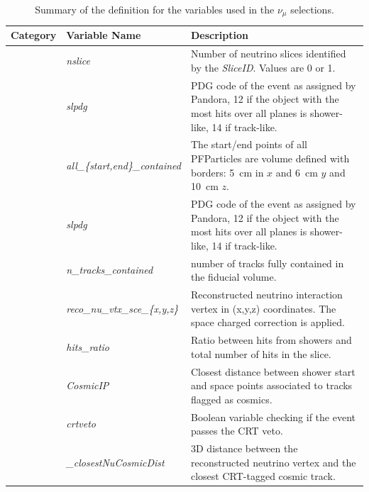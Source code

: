 \begin{table}[ht]
\caption{\label{tab:numuvariableSummary} Summary of the definition for the variables used in the $\nu_{\mu}$ selections.}
\centering
\begin{tabular}{ m{} | m{} | m{}  }
Category & Variable Name & Description  \\
\hline

\multicolumn{1}{l|}{} & \emph{nslice} &  Number of neutrino slices identified by the \emph{SliceID}. Values are  0 or 1.\\  \cline{2-3}
\multicolumn{1}{l|}{} & \emph{slpdg} &  PDG code of the event as assigned by Pandora, 12 if the object with the most hits over all planes is shower-like, 14 if track-like.\\  \cline{2-3}
\multicolumn{1}{l|}{} & \emph{all\_\{start,end\}\_contained} &  The start/end points of all PFParticles are volume defined with borders: \SI{5}{\cm} in $x$ and \SI{6}{\cm} $y$ and \SI{10}{\cm} $z$.\\  \cline{2-3}
\multicolumn{1}{l|}{} & \emph{slpdg} &  PDG code of the event as assigned by Pandora, 12 if the object with the most hits over all planes is shower-like, 14 if track-like.\\  \cline{2-3}
\multicolumn{1}{l|}{} & \emph{n\_tracks\_contained} &  number of tracks fully contained in the fiducial volume.\\  \cline{2-3}
\multicolumn{1}{l|}{} & \emph{reco\_nu\_vtx\_sce\_\{x,y,z\}} & Reconstructed neutrino interaction vertex in (x,y,z) coordinates. The space charged correction is applied.  \\  \cline{2-3}
\parbox[t]{2mm}{} & \emph{hits\_ratio} & Ratio between hits from showers and total number of hits in the slice. \\  
 & \emph{CosmicIP} & Closest distance between shower start and space points associated to tracks flagged as cosmics. \\  
 & \emph{crtveto} & Boolean variable checking if the event passes the CRT veto. \\  
 & \emph{\_closestNuCosmicDist} &  3D distance between the reconstructed neutrino vertex and the closest CRT-tagged cosmic track. \\  
\hline



\end{tabular}
\end{table}
